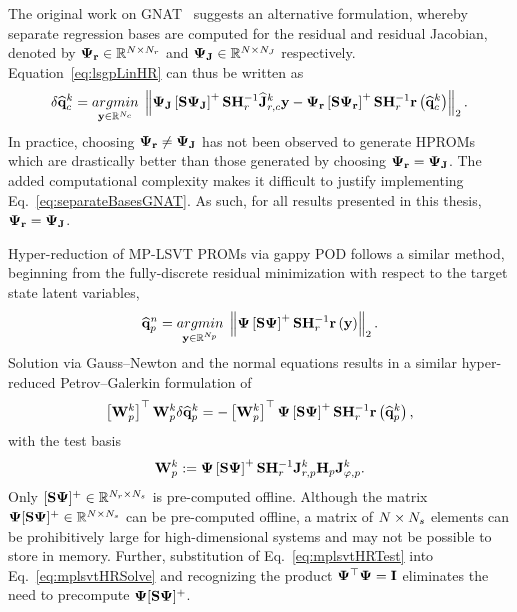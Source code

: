 %
The original work on GNAT~\cite{Carlberg2013} suggests an alternative formulation, whereby separate regression bases are computed for the residual and residual Jacobian, denoted by $\deimBasisRes \inRTwo{\numDOF}{\numResModes}$ and $\deimBasisJacob \inRTwo{\numDOF}{\numJacobModes}$ respectively. Equation~\ref{eq:lsgpLinHR} can thus be written as
%
\begin{equation}\label{eq:separateBasesGNAT}
    \delta \consVecCoef^{\newtonIdx} = \argmin{\dummyVec \inROne{\numConsModes}} \left\Vert \deimBasisJacob \left[ \sampMat \deimBasisJacob \right]^{+} \sampMat \resScaleInv \jacobResCoefCons^{\newtonIdx} \dummyVec - \deimBasisRes \left[ \sampMat \deimBasisRes \right]^{+} \sampMat \resScaleInv \resFunc{\consVecCoef^{\newtonIdx}} \right\Vert_2.
\end{equation}
%
In practice, choosing $\deimBasisRes \neq \deimBasisJacob$ has not been observed to generate HPROMs which are drastically better than those generated by choosing $\deimBasisRes = \deimBasisJacob$. The added computational complexity makes it difficult to justify implementing Eq.~\ref{eq:separateBasesGNAT}. As such, for all results presented in this thesis, $\deimBasisRes = \deimBasisJacob$.

Hyper-reduction of MP-LSVT PROMs via gappy POD follows a similar method, beginning from the fully-discrete residual minimization with respect to the target state latent variables,
%
\begin{equation}
    \primVecCoef^{\timeIdx} = \argmin{\dummyVec \inROne{\numPrimModes}} \left\Vert \deimBasis \left[ \sampMat \deimBasis \right]^{+} \sampMat \resScaleInv \resFunc{\dummyVec} \right\Vert_2.
\end{equation}
%
Solution via Gauss--Newton and the normal equations results in a similar hyper-reduced Petrov--Galerkin formulation of
%
\begin{equation}\label{eq:mplsvtHRSolve}
    \left[ \testBasisPrim^\newtonIdx \right]^\top \testBasisPrim^\newtonIdx \delta \primVecCoef^{\newtonIdx} = -\left[\testBasisPrim^\newtonIdx \right]^\top \deimBasis \left[ \sampMat \deimBasis \right]^{+} \sampMat \resScaleInv \resFunc{\primVecCoef^{\newtonIdx}},
\end{equation}
%
with the test basis
%
\begin{equation}\label{eq:mplsvtHRTest}
    \testBasisPrim^\newtonIdx \defEq \deimBasis \left[ \sampMat \deimBasis \right]^{+} \sampMat \resScaleInv \jacobResPrim^{\newtonIdx} \jacobDecodePrim^{\newtonIdx}.
\end{equation}
%
Only $[ \sampMat \deimBasis ]^{+} \inRTwo{\numResModes}{\numSamps}$ is pre-computed offline. Although the matrix $\deimBasis [ \sampMat \deimBasis ]^{+} \inRTwo{\numDOF}{\numSamps}$ can be pre-computed offline, a matrix of $N \times N_s$ elements can be prohibitively large for high-dimensional systems and may not be possible to store in memory. Further, substitution of Eq.~\ref{eq:mplsvtHRTest} into Eq.~\ref{eq:mplsvtHRSolve} and recognizing the product $\deimBasis^\top \deimBasis = \identMat$ eliminates the need to precompute $\deimBasis [ \sampMat \deimBasis ]^{+}$.

